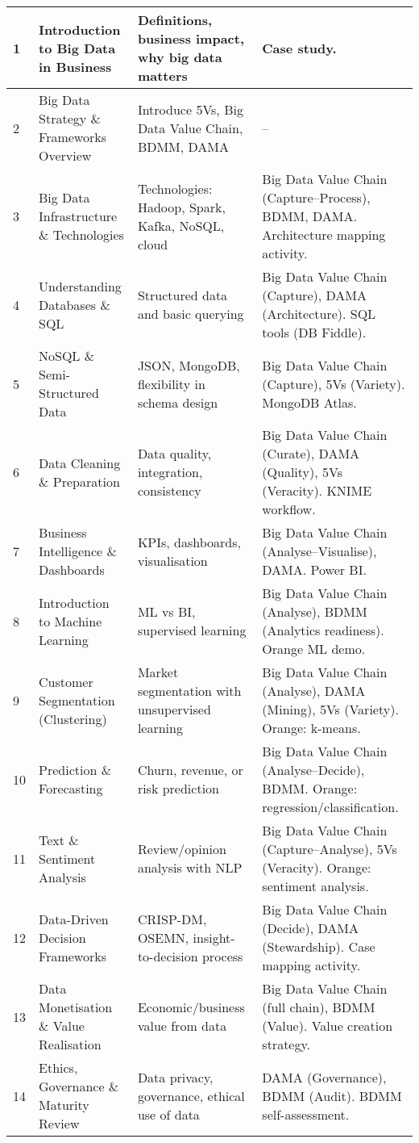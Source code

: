 \begin{longtable}{|p{}|p{}|p{}|p{}|}
	1 & Introduction to Big Data in Business & Definitions, business impact, why big data matters & Case study. \\
	\hline
	2 & Big Data Strategy \& Frameworks Overview & Introduce 5Vs, Big Data Value Chain, BDMM, DAMA & -- \\
	\hline
	3 & Big Data Infrastructure \& Technologies & Technologies: Hadoop, Spark, Kafka, NoSQL, cloud & Big Data Value Chain (Capture–Process), BDMM, DAMA. Architecture mapping activity. \\
	\hline
	4 & Understanding Databases \& SQL & Structured data and basic querying & Big Data Value Chain (Capture), DAMA (Architecture). SQL tools (DB Fiddle). \\
	\hline
	5 & NoSQL \& Semi-Structured Data & JSON, MongoDB, flexibility in schema design & Big Data Value Chain (Capture), 5Vs (Variety). MongoDB Atlas. \\
	\hline
	6 & Data Cleaning \& Preparation & Data quality, integration, consistency & Big Data Value Chain (Curate), DAMA (Quality), 5Vs (Veracity). KNIME workflow. \\
	\hline
	7 & Business Intelligence \& Dashboards & KPIs, dashboards, visualisation & Big Data Value Chain (Analyse–Visualise), DAMA. Power BI. \\
	\hline
	8 & Introduction to Machine Learning & ML vs BI, supervised learning & Big Data Value Chain (Analyse), BDMM (Analytics readiness). Orange ML demo. \\
	\hline
	9 & Customer Segmentation (Clustering) & Market segmentation with unsupervised learning & Big Data Value Chain (Analyse), DAMA (Mining), 5Vs (Variety). Orange: k-means. \\
	\hline
	10 & Prediction \& Forecasting & Churn, revenue, or risk prediction & Big Data Value Chain (Analyse–Decide), BDMM. Orange: regression/classification. \\
	\hline
	11 & Text \& Sentiment Analysis & Review/opinion analysis with NLP & Big Data Value Chain (Capture–Analyse), 5Vs (Veracity). Orange: sentiment analysis. \\
	\hline
	12 & Data-Driven Decision Frameworks & CRISP-DM, OSEMN, insight-to-decision process & Big Data Value Chain (Decide), DAMA (Stewardship). Case mapping activity. \\
	\hline
	13 & Data Monetisation \& Value Realisation & Economic/business value from data & Big Data Value Chain (full chain), BDMM (Value). Value creation strategy. \\
	\hline
	14 & Ethics, Governance \& Maturity Review & Data privacy, governance, ethical use of data & DAMA (Governance), BDMM (Audit). BDMM self-assessment. \\
	\hline
	
\end{longtable}



